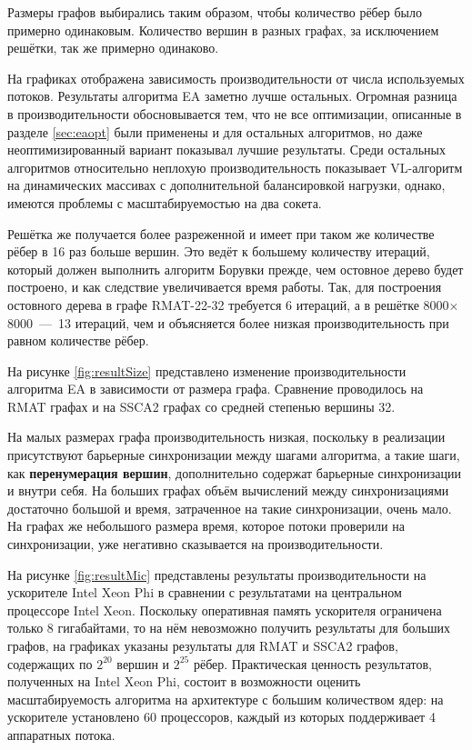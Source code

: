 \documentclass[a4paper,12pt]{extarticle}
\begin{document}
Размеры графов выбирались таким образом, чтобы количество рёбер было примерно одинаковым. Количество вершин в разных графах, за исключением решётки, так же примерно одинаково. 

На графиках отображена зависимость производительности от числа используемых потоков.
Результаты алгоритма EA заметно лучше остальных. Огромная разница в производительности обосновывается тем, что не все оптимизации, описанные в разделе \ref{sec:eaopt} были применены и для остальных алгоритмов, но даже неоптимизированный вариант показывал лучшие результаты.
Среди остальных алгоритмов относительно неплохую производительность показывает VL-алгоритм на динамических массивах с дополнительной балансировкой нагрузки, однако, имеются проблемы с масштабируемостью на два сокета.

Решётка же получается более разреженной и имеет при таком же количестве рёбер в 16 раз больше вершин. 
Это ведёт к большему количеству итераций, который должен выполнить алгоритм Борувки прежде, чем остовное дерево будет построено, и как следствие увеличивается время работы. Так, для построения остовного дерева в графе RMAT-22-32 требуется 6 итераций, а в решётке 8000$\times$8000~---~13 итераций, чем и объясняется более низкая производительность при равном количестве рёбер.




На рисунке \ref{fig:resultSize} представлено изменение производительности алгоритма EA в зависимости от размера графа. Сравнение проводилось на RMAT графах  и на SSCA2 графах со средней степенью вершины 32. 

На малых размерах графа производительность низкая, поскольку в реализации присутствуют барьерные синхронизации между шагами алгоритма, а такие шаги, как \textbf{перенумерация вершин}, дополнительно содержат барьерные синхронизации и внутри себя. На больших графах объём вычислений  между синхронизациями достаточно большой и время, затраченное на такие синхронизации, очень мало. На графах же небольшого размера время, которое потоки проверили на синхронизации, уже негативно сказывается на производительности.


На рисунке \ref{fig:resultMic} представлены результаты производительности на ускорителе Intel Xeon Phi в сравнении с результатами на центральном процессоре Intel Xeon.
Поскольку оперативная память ускорителя ограничена только 8 гигабайтами, то на нём невозможно получить результаты для больших графов, на графиках указаны результаты для RMAT и SSCA2 графов, содержащих по $2^{20}$ вершин и $2^{25}$ рёбер.
Практическая ценность результатов, полученных на Intel Xeon Phi, состоит в возможности оценить масштабируемость алгоритма на архитектуре с большим количеством ядер: на ускорителе установлено 60 процессоров, каждый из которых поддерживает 4 аппаратных потока.
\end{document}
